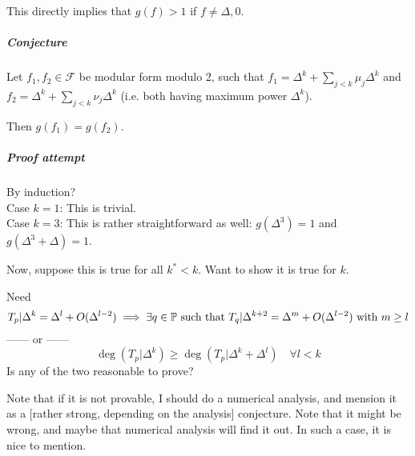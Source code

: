 This directly implies that $g(f) > 1$ if $f \neq \Delta, 0$.

\subparagraph{Conjecture}
Let $f_1,f_2 \in \mathcal{F}$ be modular form modulo 2, such that
$f_1 = \Delta^k + \sum_{j < k} \mu_j \Delta^k$
and
$f_2 = \Delta^k + \sum_{j < k} \nu_j \Delta^k$
(i.e. both having maximum power $\Delta^k$).

Then $g(f_1)=g(f_2)$.

\subparagraph{Proof attempt}
By induction?\\
Case $k=1$: This is trivial.\\
Case $k=3$: This is rather straightforward as well: $g(\Delta^3)=1$ and $g(\Delta^3+\Delta)=1$.

Now, suppose this is true for all $k^* < k$.
Want to show it is true for $k$.

Need 
$$
T_p|\Delta^k = \Delta^l + O(\Delta^{l-2}) 
\implies
\exists q \in \mathbb{P} \text{ such that } 
T_q|\Delta^{k+2}=\Delta^m + O(\Delta^{l-2}) 
\text{ with } m \geq l
$$
------ or ------
$$
\deg(T_p|\Delta^k) \geq \deg(T_p|\Delta^k+\Delta^l) \quad \forall l<k
$$
Is any of the two reasonable to prove?


Note that if it is not provable, I should do a numerical analysis, and mension it as a [rather strong, depending on the analysis] conjecture.
Note that it might be wrong, and maybe that numerical analysis will find it out. In such a case, it is nice to mention.

